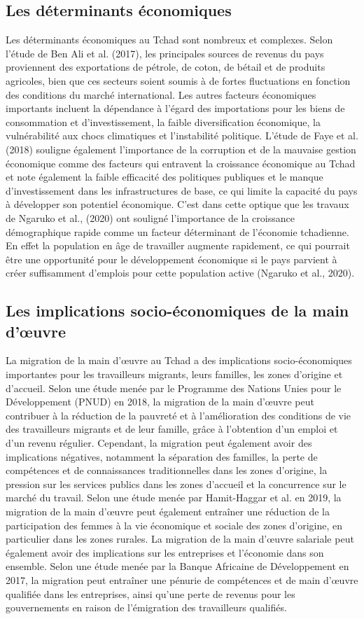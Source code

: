\documentclass[12pt,oneside]{report}
\begin{document}
\subsection{Les déterminants économiques}
Les déterminants économiques au Tchad sont nombreux et complexes. Selon l'étude de Ben Ali et al. (2017), les principales sources de revenus du pays proviennent des exportations de pétrole, de coton, de bétail et de produits agricoles, bien que ces secteurs soient soumis à de fortes fluctuations en fonction des conditions du marché international. Les autres facteurs économiques importants incluent la dépendance à l'égard des importations pour les biens de consommation et d'investissement, la faible diversification économique, la vulnérabilité aux chocs climatiques et l'instabilité politique. L'étude de Faye et al. (2018) souligne également l'importance de la corruption et de la mauvaise gestion économique comme des facteurs qui entravent la croissance économique au Tchad et note également la faible efficacité des politiques publiques et le manque d'investissement dans les infrastructures de base, ce qui limite la capacité du pays à développer son potentiel économique. C’est dans cette optique que les travaux de Ngaruko et al., (2020) ont souligné l'importance de la croissance démographique rapide comme un facteur déterminant de l'économie tchadienne. En effet la population en âge de travailler augmente rapidement, ce qui pourrait être une opportunité pour le développement économique si le pays parvient à créer suffisamment d'emplois pour cette population active (Ngaruko et al., 2020).

\subsection{Les implications socio-économiques de la main d’œuvre}
La migration de la main d'œuvre au Tchad a des implications socio-économiques importantes pour les travailleurs migrants, leurs familles, les zones d'origine et d'accueil. Selon une étude menée par le Programme des Nations Unies pour le Développement (PNUD) en 2018, la migration de la main d'œuvre peut contribuer à la réduction de la pauvreté et à l'amélioration des conditions de vie des travailleurs migrants et de leur famille, grâce à l'obtention d'un emploi et d'un revenu régulier. Cependant, la migration peut également avoir des implications négatives, notamment la séparation des familles, la perte de compétences et de connaissances traditionnelles dans les zones d'origine, la pression sur les services publics dans les zones d'accueil et la concurrence sur le marché du travail. Selon une étude menée par Hamit-Haggar et al. en 2019, la migration de la main d'œuvre peut également entraîner une réduction de la participation des femmes à la vie économique et sociale des zones d'origine, en particulier dans les zones rurales. La migration de la main d'œuvre salariale peut également avoir des implications sur les entreprises et l'économie dans son ensemble. Selon une étude menée par la Banque Africaine de Développement en 2017, la migration peut entraîner une pénurie de compétences et de main d'œuvre qualifiée dans les entreprises, ainsi qu'une perte de revenus pour les gouvernements en raison de l'émigration des travailleurs qualifiés.
\end{document}
